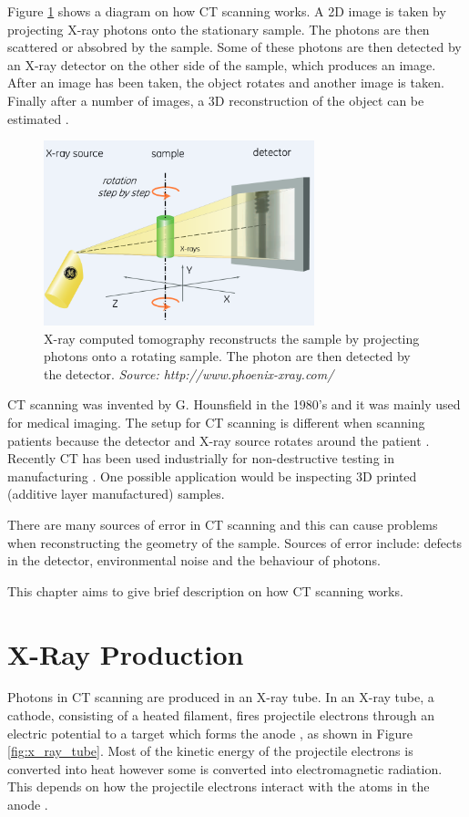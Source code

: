 \documentclass[12pt]{report}
\begin{document}
Figure \ref{fig:x_ray_ct} shows a diagram on how CT scanning works. A 2D image is taken by projecting X-ray photons onto the stationary sample. The photons are then scattered or absobred by the sample.  Some of these photons are then detected by an X-ray detector on the other side of the sample, which produces an image. After an image has been taken, the object rotates and another image is taken. Finally after a number of images, a 3D reconstruction of the object can be estimated \cite{cantatore2011introduction}.

\begin{figure}
\centering
\includegraphics[width=0.7\textwidth]{figures/x_ray_ct.png}
\caption{X-ray computed tomography reconstructs the sample by projecting photons onto a rotating sample. The photon are then detected by the detector. \emph{Source: http://www.phoenix-xray.com/}}
\label{fig:x_ray_ct}
\end{figure}

CT scanning was invented by G. Hounsfield \cite{hounsfield1980computed} in the 1980's and it was mainly used for medical imaging. The setup for CT scanning is different when scanning patients because the detector and X-ray source rotates around the patient \cite{cantatore2011introduction}. Recently CT has been used industrially for non-destructive testing in manufacturing \cite{cantatore2011introduction}. One possible application would be inspecting 3D printed (additive layer manufactured) samples.

There are many sources of error in CT scanning \cite{cantatore2011introduction} and this can cause problems when reconstructing the geometry of the sample. Sources of error include: defects in the detector, environmental noise and the behaviour of photons.

This chapter aims to give brief description on how CT scanning works.

\section{X-Ray Production}
Photons in CT scanning are produced in an X-ray tube. In an X-ray tube, a cathode, consisting of a heated filament, fires projectile electrons through an electric potential to a target which forms the anode \cite{michael2001x}, as shown in Figure \ref{fig:x_ray_tube}. Most of the kinetic energy of the projectile electrons is converted into heat however some is converted into electromagnetic radiation. This depends on how the projectile electrons interact with the atoms in the anode \cite{cantatore2011introduction}.
\end{document}
